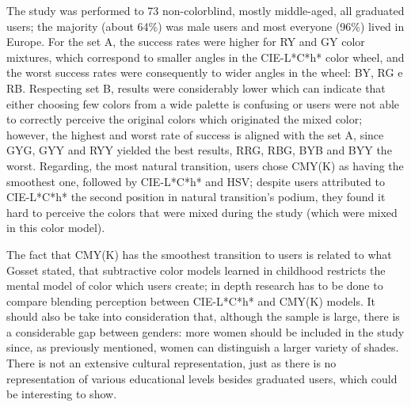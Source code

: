 \documentclass{report}
\begin{document}
The study was performed to 73 non-colorblind, mostly middle-aged, all graduated users; the majority
(about 64\%) was male users and most everyone (96\%) lived in Europe. For the set A, the success rates
were higher for RY and GY color mixtures, which correspond to smaller angles in the CIE-L*C*h* color wheel,
and the worst success rates were consequently to wider angles in the wheel: BY, RG e RB.
Respecting set B, results were considerably lower which can indicate that either choosing few colors from
a wide palette is confusing or users were not able to correctly perceive the original colors which originated
the mixed color; however, the highest and worst rate of success is aligned with the set A, since GYG, GYY
and RYY yielded the best results, RRG, RBG, BYB and BYY the worst. Regarding, the most natural transition,
users chose CMY(K) as having the smoothest one, followed by CIE-L*C*h* and HSV; despite users attributed to
CIE-L*C*h* the second position in natural transition’s podium, they found it hard to perceive the colors
that were mixed during the study (which were mixed in this color model). \par
The fact that CMY(K) has the smoothest transition to users is related to what Gosset \cite{Gossett2004} stated, that
subtractive color models learned in childhood restricts the mental model of color which users create;
in depth research has to be done to compare blending perception between CIE-L*C*h* and CMY(K) models. It
should also be take into consideration that, although the sample is large, there is a considerable gap
between genders: more women should be included in the study since, as previously mentioned, women can
distinguish a larger variety of shades. There is not an extensive cultural representation, just as there
is no representation of various educational levels besides graduated users, which could be interesting to show. \par
%
\end{document}
